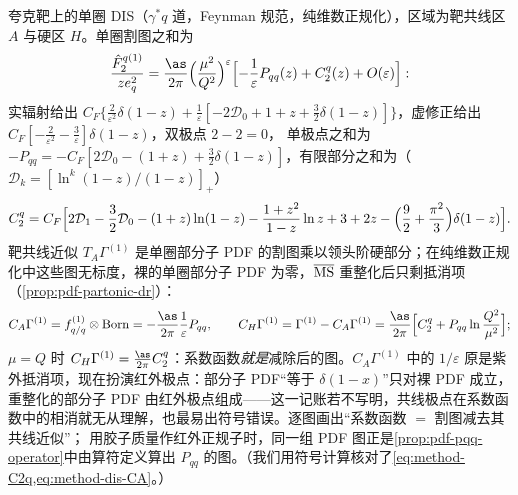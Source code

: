 \begin{example}\label{ex:method-dis-oneloop}
夸克靶上的单圈 DIS（$\gamma^*q$ 道，Feynman 规范，纯维数正规化），区域为靶共线区 $A$ 与硬区 $H$。单圈割图之和为
\begin{equation}\label{eq:method-dis-gamma1}
\frac{\hat F_2^{q(1)}}{ze_q^2}=\frac{\as}{2\pi}\Bigl(\frac{\mu^2}{Q^2}\Bigr)^{\varepsilon}\Bigl[-\frac1\varepsilon P_{qq}(z)+C_2^q(z)+O(\varepsilon)\Bigr] :
\end{equation}
实辐射给出 $C_F\{\frac2{\varepsilon^2}\delta(1-z)+\frac1\varepsilon[-2\mathcal D_0+1+z+\frac32\delta(1-z)]\}$，虚修正给出 $C_F[-\frac2{\varepsilon^2}-\frac3\varepsilon]\delta(1-z)$，双极点 $2-2=0$，
单极点之和为 $-P_{qq}=-C_F[2\mathcal D_0-(1+z)+\frac32\delta(1-z)]$，有限部分之和为（$\mathcal D_k=[\ln^k(1-z)/(1-z)]_+$）
\begin{equation}\label{eq:method-C2q}
C_2^q=C_F\Bigl[2\mathcal D_1-\frac32\mathcal D_0-(1+z)\ln(1-z)-\frac{1+z^2}{1-z}\ln z+3+2z-\Bigl(\frac92+\frac{\pi^2}3\Bigr)\delta(1-z)\Bigr] .
\end{equation}
靶共线近似 $T_A\Gamma^{(1)}$ 是单圈部分子 PDF 的割图乘以领头阶硬部分；在纯维数正规化中这些图无标度，裸的单圈部分子 PDF 为零，$\overline{\rm MS}$ 重整化后只剩抵消项（\cref{prop:pdf-partonic-dr}）：
\begin{equation}\label{eq:method-dis-CA}
C_A\Gamma^{(1)}=f^{(1)}_{q/q}\otimes{\rm Born}=-\frac{\as}{2\pi}\frac1\varepsilon P_{qq},\qquad
C_H\Gamma^{(1)}=\Gamma^{(1)}-C_A\Gamma^{(1)}=\frac{\as}{2\pi}\Bigl[C_2^q+P_{qq}\ln\frac{Q^2}{\mu^2}\Bigr] ;
\end{equation}
$\mu=Q$ 时 $C_H\Gamma^{(1)}=\frac{\as}{2\pi}C_2^q$：系数函数\emph{就是}减除后的图。$C_A\Gamma^{(1)}$ 中的 $1/\varepsilon$ 原是紫外抵消项，现在扮演红外极点：部分子 PDF“等于 $\delta(1-x)$”只对裸 PDF 成立，
重整化的部分子 PDF 由红外极点组成——这一记账若不写明，共线极点在系数函数中的相消就无从理解，也最易出符号错误。逐图画出“系数函数 $=$ 割图减去其共线近似”；
用胶子质量作红外正规子时，同一组 PDF 图正是\cref{prop:pdf-pqq-operator}中由算符定义算出 $P_{qq}$ 的图。（我们用符号计算核对了\cref{eq:method-C2q,eq:method-dis-CA}。）%
\end{example}

